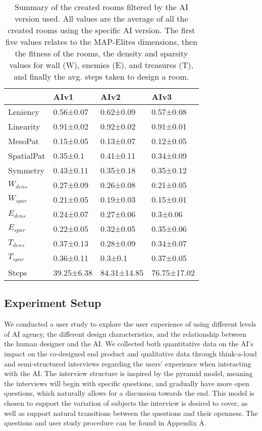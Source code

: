 \begin{table}[]
\centering
\begin{tabular}{|l|lll|}
\hline
        & AIv1       & AIv2        & AIv3        \\ \hline
Leniency        & 0.56±0.07  & 0.62±0.09   & 0.57±0.08   \\
Linearity        & 0.91±0.02  & 0.92±0.02   & 0.91±0.01   \\
MesoPat       & 0.15±0.05  & 0.13±0.07   & 0.12±0.05   \\
SpatialPat    & 0.35±0.1   & 0.41±0.11   & 0.34±0.09   \\
Symmetry   & 0.43±0.11  & 0.35±0.18   & 0.35±0.12   \\
$W_{dens}$ & 0.27±0.09  & 0.26±0.08   & 0.21±0.05   \\
$W_{spar}$ & 0.21±0.05  & 0.19±0.03   & 0.15±0.01   \\
$E_{dens}$ & 0.24±0.07  & 0.27±0.06   & 0.3±0.06    \\
$E_{spar}$ & 0.22±0.05  & 0.32±0.05   & 0.35±0.06   \\
$T_{dens}$ & 0.37±0.13  & 0.28±0.09   & 0.34±0.07   \\
$T_{spar}$ & 0.36±0.11  & 0.3±0.1     & 0.37±0.05   \\ \hline
Steps      & 39.25±6.38 & 84.31±14.85 & 76.75±17.02 \\ \hline
\end{tabular}
\caption{Summary of the created rooms filtered by the AI version used. All values are the average of all the created rooms using the specific AI version. The first five values relates to the MAP-Elites dimensions, then the fitness of the rooms, the density and sparsity values for wall (W), enemies (E), and treasures (T), and finally the avg. steps taken to design a room.}
\label{tab:AIavgValues}
\end{table}

\subsection{Experiment Setup}

We conducted a user study to explore the user experience of using different levels of AI agency, the different design characteristics, and the relationship between the human designer and the AI. We collected both quantitative data on the AI's impact on the co-designed end product and qualitative data through think-a-loud and semi-structured interviews regarding the users' experience when interacting with the AI. The interview structure is inspired by the pyramid model, meaning the interviews will begin with specific questions, and gradually have more open questions, which naturally allows for a discussion towards the end. This model is chosen to support the variation of subjects the interview is desired to cover, as well as support natural transitions between the questions and their openness. The questions and user study procedure can be found in Appendix A. 

